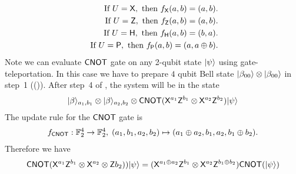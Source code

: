 \begin{definition}
\begin{equation*}
\begin{aligned}
\mbox{ If } U={\sf X},  \mbox{ then } f_{\sf X}(a,b)=(a,b).\\
\mbox{ If } U={\sf Z},  \mbox{ then } f_{\sf Z}(a,b)=(a,b).\\
\mbox{ If } U={\sf H},  \mbox{ then } f_{\sf H}(a,b)=(b,a).\\
\mbox{ If } U={\sf P},  \mbox{ then } f_ {\sf P}(a,b)=(a,a\oplus b).\\
\end{aligned}
\end{equation*}
Note we can evaluate ${\sf CNOT}$ gate on any 2-qubit state ${\lvert}\psi\rangle$ using gate-teleportation. In this case we have to prepare $4$ qubit Bell state ${\lvert}\beta_{00}\rangle\otimes {\lvert}\beta_{00}\rangle$ in step~1 (()). After step~4 of , the system will be in the state
\begin{equation*}
\begin{aligned}
 {\lvert}\beta\rangle_{a_1,b_1}\otimes {\lvert}\beta\rangle_{a_2,b_2} \otimes {\sf CNOT}({\sf X}^{a_1}{\sf Z}^{b_1}\otimes {\sf X}^{a_2}{\sf Z}^{b_2}){\lvert}\psi\rangle
\end{aligned}
\end{equation*}
The update rule for the ${\sf CNOT}$ gate is
\begin{equation*}
\begin{aligned}
f_{{\sf CNOT}}:\mathbb{F}_2^4\rightarrow \mathbb{F}_2^4, \; (a_1,b_1,a_2,b_2)\mapsto (a_1\oplus a_2,b_1,a_2, b_1\oplus b_2).
\end{aligned}
\end{equation*}
Therefore we have
\begin{equation*}
\begin{aligned}
  {\sf CNOT}({\sf X}^{a_1}{\sf Z}^{b_1}\otimes {\sf X}^{a_2}\otimes {\sf Z}{b_2})){\lvert}\psi\rangle= ({\sf X}^{a_1\oplus a_2}{\sf Z}^{b_1}\otimes {\sf X}^{a_2} {\sf Z}^{b_1\oplus b_2}){\sf CNOT}({\lvert}\psi\rangle)
 \end{aligned}
\end{equation*}
	

\end{definition}
